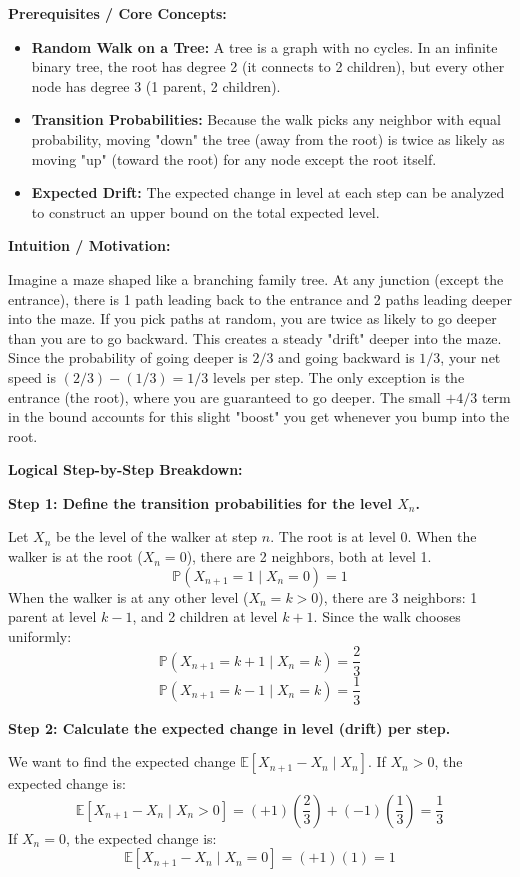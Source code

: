 \begin{solution}
\textbf{Prerequisites / Core Concepts:}
\begin{itemize}
    \item \textbf{Random Walk on a Tree:} A tree is a graph with no cycles. In an infinite binary tree, the root has degree 2 (it connects to 2 children), but every other node has degree 3 (1 parent, 2 children).
    \item \textbf{Transition Probabilities:} Because the walk picks any neighbor with equal probability, moving "down" the tree (away from the root) is twice as likely as moving "up" (toward the root) for any node except the root itself.
    \item \textbf{Expected Drift:} The expected change in level at each step can be analyzed to construct an upper bound on the total expected level.
\end{itemize}

\textbf{Intuition / Motivation:}

Imagine a maze shaped like a branching family tree. At any junction (except the entrance), there is 1 path leading back to the entrance and 2 paths leading deeper into the maze. If you pick paths at random, you are twice as likely to go deeper than you are to go backward. This creates a steady "drift" deeper into the maze. Since the probability of going deeper is $2/3$ and going backward is $1/3$, your net speed is $(2/3) - (1/3) = 1/3$ levels per step. The only exception is the entrance (the root), where you are guaranteed to go deeper. The small $+4/3$ term in the bound accounts for this slight "boost" you get whenever you bump into the root.

\textbf{Logical Step-by-Step Breakdown:}

\textbf{Step 1: Define the transition probabilities for the level $X_n$.}

Let $X_n$ be the level of the walker at step $n$. The root is at level 0.
When the walker is at the root ($X_n = 0$), there are 2 neighbors, both at level 1.
\[ \mathbb{P}(X_{n+1} = 1 \mid X_n = 0) = 1 \]
When the walker is at any other level ($X_n = k > 0$), there are 3 neighbors: 1 parent at level $k-1$, and 2 children at level $k+1$. Since the walk chooses uniformly:
\[ \mathbb{P}(X_{n+1} = k+1 \mid X_n = k) = \frac{2}{3} \]
\[ \mathbb{P}(X_{n+1} = k-1 \mid X_n = k) = \frac{1}{3} \]

\textbf{Step 2: Calculate the expected change in level (drift) per step.}

We want to find the expected change $\mathbb{E}[X_{n+1} - X_n \mid X_n]$.
If $X_n > 0$, the expected change is:
\[ \mathbb{E}[X_{n+1} - X_n \mid X_n > 0] = (+1)\left(\frac{2}{3}\right) + (-1)\left(\frac{1}{3}\right) = \frac{1}{3} \]
If $X_n = 0$, the expected change is:
\[ \mathbb{E}[X_{n+1} - X_n \mid X_n = 0] = (+1)(1) = 1 \]


\end{solution}
